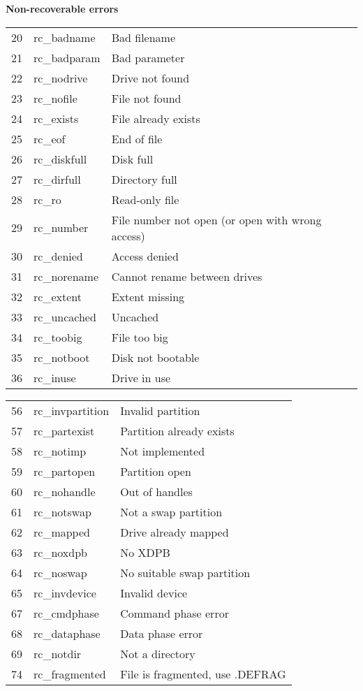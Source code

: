 \textbf{Non-recoverable errors}

\begin{tabular}[h]{ l l l }
20 & rc\_badname & Bad filename\\
21 & rc\_badparam & Bad parameter\\
22 & rc\_nodrive & Drive not found\\
23 & rc\_nofile & File not found\\
24 & rc\_exists & File already exists\\
25 & rc\_eof & End of file\\
26 & rc\_diskfull & Disk full\\
27 & rc\_dirfull & Directory full\\
28 & rc\_ro & Read-only file\\
29 & rc\_number & File number not open (or open with wrong access)\\
30 & rc\_denied & Access denied\\
31 & rc\_norename & Cannot rename between drives\\
32 & rc\_extent & Extent missing\\
33 & rc\_uncached & Uncached\\
34 & rc\_toobig & File too big\\
35 & rc\_notboot & Disk not bootable\\
36 & rc\_inuse & Drive in use\\
\end{tabular}

\begin{tabular}[h]{ l l l }
56 & rc\_invpartition & Invalid partition\\
57 & rc\_partexist & Partition already exists\\
58 & rc\_notimp & Not implemented\\
59 & rc\_partopen & Partition open\\
60 & rc\_nohandle & Out of handles\\
61 & rc\_notswap & Not a swap partition\\
62 & rc\_mapped & Drive already mapped\\
63 & rc\_noxdpb & No XDPB\\
64 & rc\_noswap & No suitable swap partition\\
65 & rc\_invdevice & Invalid device\\
67 & rc\_cmdphase & Command phase error\\
68 & rc\_dataphase & Data phase error\\
69 & rc\_notdir & Not a directory\\
74 & rc\_fragmented & File is fragmented, use .DEFRAG\\
\end{tabular}

